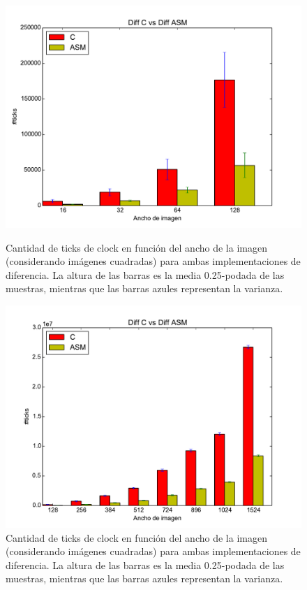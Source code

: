 \begin{figure}[H]
\centering
\begin{minipage}{0.45\textwidth}
  \centering
    \includegraphics[width=1\textwidth]{../graficos/barplot_diff1}
  \caption{\footnotesize Cantidad de ticks de clock en función del ancho de la imagen (considerando imágenes cuadradas) para ambas implementaciones de diferencia. La altura de las barras es la media 0.25-podada de las muestras, mientras que las barras azules representan la varianza.}
  \label{fig:exp-diff-bar1}
\end{minipage}%
\hspace{0.03\textwidth}
\begin{minipage}{0.45\textwidth}   
  \centering
    \includegraphics[width=1\textwidth]{../graficos/barplot_diff2} 
  \caption{\footnotesize Cantidad de ticks de clock en función del ancho de la imagen (considerando imágenes cuadradas) para ambas implementaciones de diferencia. La altura de las barras es la media 0.25-podada de las muestras, mientras que las barras azules representan la varianza.}
  \label{fig:exp-diff-bar2}
\end{minipage}%
\end{figure}


